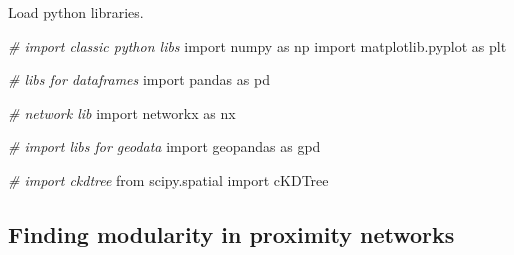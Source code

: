 \documentclass[]{article}
\newenvironment{Shaded}{}{}
\newcommand{\CommentTok}[1]{\textcolor[rgb]{0.38,0.63,0.69}{\textit{#1}}}
\newcommand{\ImportTok}[1]{#1}
\newcommand{\NormalTok}[1]{#1}
\begin{document}
Load python libraries.

\begin{Shaded}
\begin{Highlighting}[]
\CommentTok{# import classic python libs}
\ImportTok{import}\NormalTok{ numpy }\ImportTok{as}\NormalTok{ np}
\ImportTok{import}\NormalTok{ matplotlib.pyplot }\ImportTok{as}\NormalTok{ plt}

\CommentTok{# libs for dataframes}
\ImportTok{import}\NormalTok{ pandas }\ImportTok{as}\NormalTok{ pd}

\CommentTok{# network lib}
\ImportTok{import}\NormalTok{ networkx }\ImportTok{as}\NormalTok{ nx}

\CommentTok{# import libs for geodata}
\ImportTok{import}\NormalTok{ geopandas }\ImportTok{as}\NormalTok{ gpd}

\CommentTok{# import ckdtree}
\ImportTok{from}\NormalTok{ scipy.spatial }\ImportTok{import}\NormalTok{ cKDTree}
\end{Highlighting}
\end{Shaded}

\hypertarget{finding-modularity-in-proximity-networks}{%
\subsection{Finding modularity in proximity networks}\label{finding-modularity-in-proximity-networks}}
\end{document}
